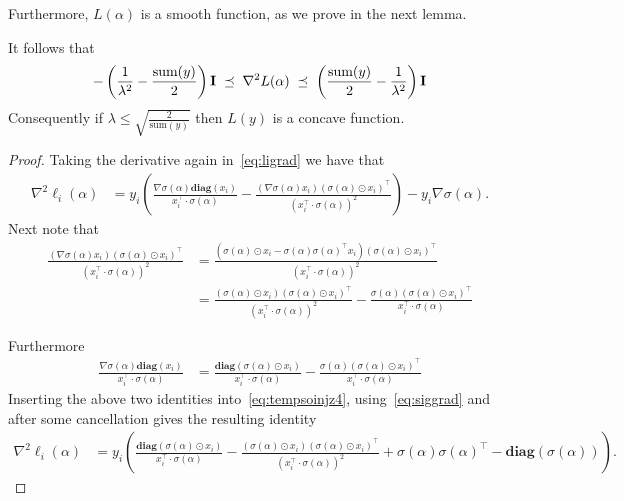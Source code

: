 \documentclass[11pt]{article}
\newcommand{\diag}[1]{\mathbf{diag}\left( #1\right)}
\newcommand{\mI}{{\bf I}}
\begin{document}
Furthermore, $L(\alpha)$ is a smooth function, as we prove in the next lemma.
\begin{lemma}
It follows that 
\begin{equation}\label{eq:Lhess}
-\left(\frac{1}{\lambda^2}-\frac{ \mbox{sum}(y)}{2}\right)  \mI  \; \preceq \; \nabla^2 L(\alpha) \; \preceq \; \left(\frac{ \mbox{sum}(y)}{2}-\frac{1}{\lambda^2} \right) \mI
\end{equation}
Consequently if $\lambda \leq \sqrt{\tfrac{2}{ \mbox{sum}(y)}}$ then $L(y)$ is a concave function.
\end{lemma}
\begin{proof}
Taking the derivative again in~\eqref{eq:ligrad} we have that
\begin{align}
\nabla^2 \ell_i(\alpha) & =   y_i \left(\frac{\nabla \sigma(\alpha)  \diag{ x_i}}{ x_i^{\top} \cdot \sigma(\alpha) } - \frac{ (\nabla \sigma(\alpha) x_i)(\sigma(\alpha)  \odot x_i)^\top}{( x_i^{\top} \cdot \sigma(\alpha) )^2}  \right) -y_i\nabla \sigma(\alpha). \label{eq:tempsoinjz4}
\end{align}
    Next note that 
    \begin{align*}
        \frac{ (\nabla \sigma(\alpha) x_i)(\sigma(\alpha)  \odot x_i)^\top}{( x_i^{\top} \cdot \sigma(\alpha) )^2} & = \frac{ (\sigma(\alpha) \odot x_i - \sigma(\alpha)  \sigma(\alpha) ^\top x_i )(\sigma(\alpha)  \odot x_i)^\top}{( x_i^{\top} \cdot \sigma(\alpha) )^2} \\
        &= \frac{ (\sigma(\alpha) \odot x_i) (\sigma(\alpha) \odot x_i)^\top  }{( x_i^{\top} \cdot \sigma(\alpha) )^2} - \frac{\sigma(\alpha) (\sigma(\alpha) \odot x_i)^\top } { x_i^{\top} \cdot \sigma(\alpha) }
    \end{align*}

Furthermore
\begin{align*}
    \frac{\nabla \sigma(\alpha)  \diag{ x_i}}{ x_i^{\top} \cdot \sigma(\alpha) } & = \frac{  \diag{\sigma(\alpha)\odot x_i}}{ x_i^{\top} \cdot \sigma(\alpha) } -\frac{\sigma(\alpha) (\sigma(\alpha) \odot x_i)^\top }{ x_i^{\top} \cdot \sigma(\alpha) }
\end{align*}
Inserting the above two identities into~\eqref{eq:tempsoinjz4}, using~\eqref{eq:siggrad} and after some cancellation gives the resulting identity
\begin{align}
\nabla^2 \ell_i(\alpha)& = y_i \left(\frac{  \diag{\sigma(\alpha)\odot x_i}  }{ x_i^{\top} \cdot \sigma(\alpha) } -\frac{ (\sigma(\alpha) \odot x_i) (\sigma(\alpha) \odot x_i)^\top  }{( x_i^{\top} \cdot \sigma(\alpha) )^2}  +\sigma(\alpha)\sigma(\alpha)^\top - \diag{\sigma(\alpha)}\right). \label{eq:tempsoinjz4}
\end{align}


\end{proof}
\end{document}
